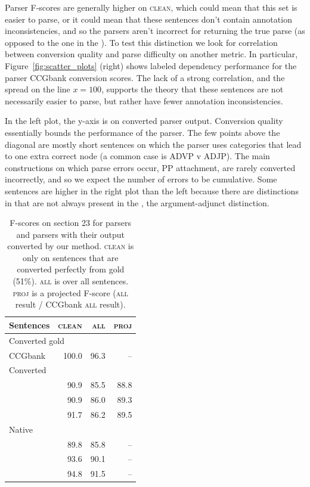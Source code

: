 Parser F-scores are generally higher on \textsc{clean}, which could mean that this
set is easier to parse, or it could mean that these sentences don't contain
annotation inconsistencies, and so the parsers aren't incorrect for returning
the true parse (as opposed to the one in the \ptb).  To test this distinction
we look for correlation between conversion quality and parse difficulty on
another metric.  In particular, Figure~\ref{fig:scatter_plots} (right) shows
\ccg labeled dependency performance for the \candc parser \myvs CCGbank
conversion \parseval scores. The lack of a strong correlation, and the spread
on the line $x=100$, supports the theory that these sentences are not
necessarily easier to parse, but rather have fewer annotation inconsistencies.

In the left plot, the y-axis is \parseval on converted \candc parser output.
Conversion quality essentially bounds the performance of the parser.
The few points above the diagonal are mostly short sentences on which the \candc parser uses categories that lead to one extra correct node (a common case is ADVP v ADJP).
The main constructions on which parse errors occur, \myeg PP attachment, are rarely converted incorrectly, and so we expect the number of errors to be cumulative.
Some sentences are higher in the right plot than the left because there are distinctions in \ccg that are not always present in the \ptb, \myeg the argument-adjunct distinction.

\begin{table}
\centering
\begin{tabular}{lrr|r}
	\hline
	Sentences & \textsc{clean} & \textsc{all} & \textsc{proj} \\
	\hline
	\hline
		\multicolumn{2}{l}{Converted gold \ccg} & & \\
		CCGbank & \hspace{0mm}100.0 & \hspace{0mm}96.3 & -- \\
	\hline
		\multicolumn{2}{l}{Converted \ccg} & & \\
		\textcite{Clark-Curran:2007} & 90.9 & 85.5 & 88.8 \\
		\textcite{Fowler-Penn:2010} & 90.9 & 86.0 & 89.3 \\
		\textcite{Auli-Lopez:2011} & 91.7 & 86.2 & 89.5 \\
	\hline
		\multicolumn{2}{l}{Native \ptb} & & \\
		\textcite{Klein-Manning:2003} & 89.8 & 85.8 & -- \\
		\textcite{Petrov-Klein:2007} & 93.6 & 90.1 & -- \\
		\textcite{Charniak-Johnson:2005} & 94.8 & 91.5 & -- \\
	\hline
\end{tabular}
\caption{
	\label{tab:full-comp}
	F-scores on section 23 for \ptb parsers and \ccg parsers with their output
	converted by our method.
	\textsc{clean} is only on sentences that are converted perfectly from gold
	\ccg (51\%).
	\textsc{all} is over all sentences.  
	\textsc{proj} is a projected F-score (\textsc{all} result / CCGbank
	\textsc{all} result).
}
\end{table}

